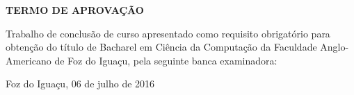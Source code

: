 \begin{folhadeaprovacao}
\begin{center}
	\vspace*{1cm}  
  	\large\textbf{TERMO DE APROVAÇÃO}
  	
  	\vspace*{1cm}
  	{\large\textbf\imprimirautor}

   \vspace*{1cm}
    {\large\textbf\imprimirtitulo}   
 \end{center}     
  
	
	\hspace{.4\textwidth}
	\SingleSpace\noindent\normalsize{Trabalho de conclusão de curso apresentado como requisito obrigatório para obtenção do título de Bacharel em Ciência da Computação da Faculdade Anglo-Americano de Foz do Iguaçu, pela seguinte banca examinadora:}
   
    
   \vspace*{0.5cm}  %
   \vspace*{2.5cm}
   \begin{center}
   	{Foz do Iguaçu, 06 de julho de 2016}
   \end{center}
   
 
\end{folhadeaprovacao}
